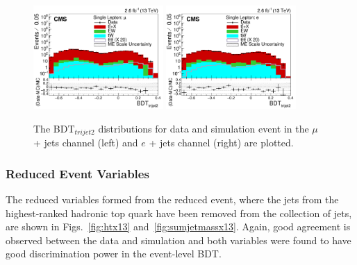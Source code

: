 \begin{figure}[ht!]
    \includegraphics[width=0.44\textwidth]{images/Run2/BDT_trijet2_StackLogY.pdf}
    \includegraphics[width=0.44\textwidth]{images/Run2/BDT_trijet2_StackLogY_e.pdf}
    \caption{ The BDT$_{trijet2}$ distributions for data and simulation event in the $\mu$ + jets channel (left) and $e$ + jets channel (right) are plotted.}
    \label{fig:bdtTrijet213}
\end{figure}

\subsubsection*{Reduced Event Variables}
The reduced variables formed from the reduced event, where the jets from the highest-ranked hadronic top quark have been removed from the collection of jets, are shown in Figs.~\ref{fig:htx13} and~\ref{fig:sumjetmassx13}. Again, good agreement is observed between the data and simulation and both variables were found to have good discrimination power in the event-level BDT.

